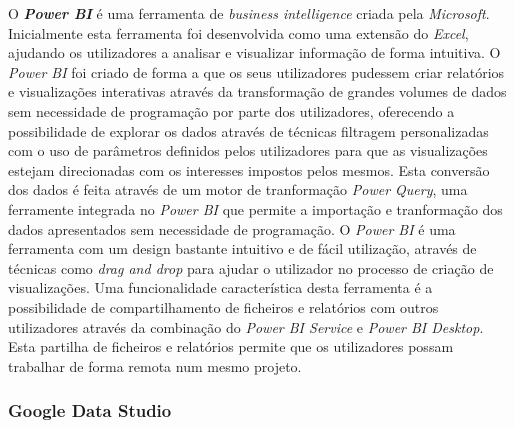 O \textbf{\textit{Power BI}} \cite{powerBI} é uma ferramenta de \textit{business intelligence} criada pela \textit{Microsoft}. Inicialmente esta ferramenta foi desenvolvida como uma extensão do \textit{Excel}, ajudando os utilizadores a analisar e visualizar informação de forma intuitiva. O \textit{Power BI} foi criado de forma a que os seus utilizadores pudessem criar relatórios e visualizações interativas através da transformação de grandes volumes de dados sem necessidade de programação por parte dos utilizadores, oferecendo a possibilidade de explorar os dados através de técnicas filtragem personalizadas com o uso de parâmetros definidos pelos utilizadores para que as visualizações estejam direcionadas com os interesses impostos pelos mesmos. Esta conversão dos dados é feita através de um motor de tranformação \textit{Power Query}, uma ferramente integrada no \textit{Power BI} que permite a importação e tranformação dos dados apresentados sem necessidade de programação. O \textit{Power BI} é uma ferramenta com um design bastante intuitivo e de fácil utilização, através de técnicas como \textit{drag and drop} para ajudar o utilizador no processo de criação de visualizações. Uma funcionalidade característica desta ferramenta é a possibilidade de compartilhamento de ficheiros e relatórios com outros utilizadores através da combinação do \textit{Power BI Service} e \textit{Power BI Desktop}. Esta partilha de ficheiros e relatórios permite que os utilizadores possam trabalhar de forma remota num mesmo projeto. %

\subsubsection{Google Data Studio} %
\label{ssub:google}

